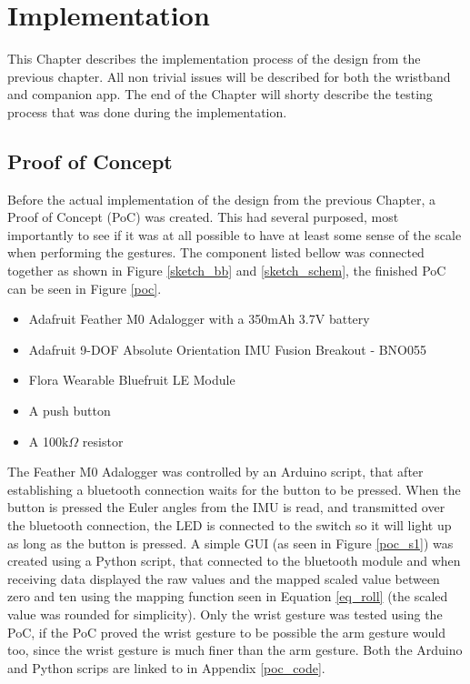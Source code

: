 \chapter{Implementation}\label{implementation}\label{implem_ch}
This Chapter describes the implementation process of the design from the previous chapter. All non trivial issues will be described for both the wristband and companion app. The end of the Chapter will shorty describe the testing process that was done during the implementation.

\section{Proof of Concept}
Before the actual implementation of the design from the previous Chapter, a Proof of Concept (PoC) was created. This had several purposed, most importantly to see if it was at all possible to have at least some sense of the scale when performing the gestures. The component listed bellow was connected together as shown in Figure \ref{sketch_bb} and \ref{sketch_schem}, the finished PoC can be seen in Figure \ref{poc}.

\begin{itemize}
    \item Adafruit Feather M0 Adalogger\cite{adalogger} with a 350mAh 3.7V battery
    \item Adafruit 9-DOF Absolute Orientation IMU Fusion Breakout - BNO055\cite{gyro}
	\item Flora Wearable Bluefruit LE Module\cite{bluefruit}
	\item A push button
	\item A 100k$\Omega$ resistor
\end{itemize}

The Feather M0 Adalogger was controlled by an Arduino script, that after establishing a bluetooth connection waits for the button to be pressed. When the button is pressed the Euler angles from the IMU is read, and transmitted over the bluetooth connection, the LED is connected to the switch so it will light up as long as the button is pressed. A simple GUI (as seen in Figure \ref{poc_s1}) was created using a Python script, that connected to the bluetooth module and when receiving data displayed the raw values and the mapped scaled value between zero and ten using the mapping function seen in Equation \ref{eq_roll} (the scaled value was rounded for simplicity). Only the wrist gesture was tested using the PoC, if the PoC proved the wrist gesture to be possible the arm gesture would too, since the wrist gesture is much finer than the arm gesture. Both the Arduino and Python scrips are linked to in Appendix \ref{poc_code}.

